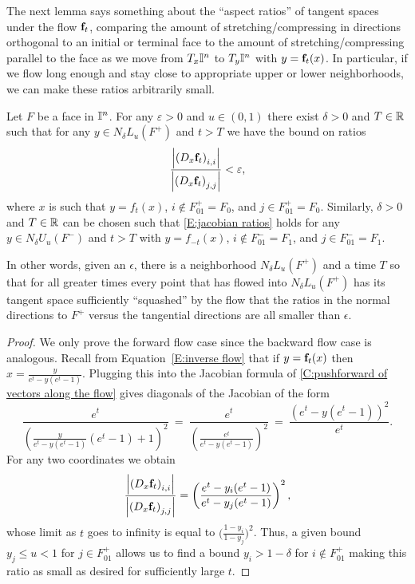The next lemma says something about the ``aspect ratios'' of tangent spaces under the flow $\mathbf{f}_t$, comparing the amount of stretching/compressing in directions orthogonal to an initial or terminal face to the amount of stretching/compressing parallel to the face as we move from $T_x\mathbb{I}^n$ to $T_{y}\mathbb{I}^n$ with $y=\mathbf{f}_t(x)$.
In particular, if we flow long enough and stay close to appropriate upper or lower neighborhoods, we can make these ratios arbitrarily small.

\begin{lemma}\label{L:jacobian ratios}
	Let $F$ be a face in $\mathbb{I}^n$.
	For any $\varepsilon > 0$ and $u \in (0,1)$ there exist $\delta > 0$ and $T\in \mathbb{R}$ such that for any $y \in N_\delta L_u(F^+)$ and $t>T$ we have the bound on ratios
	\begin{equation}\label{E:jacobian ratios}
		\frac{\left|\left(D_{x}\mathbf{f}_t\right)_{i,i}\right|}
		{\left|\left(D_{x}\mathbf{f}_t\right)_{j,j}\right|} < \varepsilon,
	\end{equation}
	where $x$ is such that $y = f_t(x)$, $i \not\in F^+_{01} = F_0$, and $j \in F^+_{01} = F_0$.
	Similarly, $\delta > 0$ and $T\in \mathbb{R}$ can be chosen such that \eqref{E:jacobian ratios} holds for any $y \in N_\delta U_u(F^-)$ and $t>T$ with $y = f_{-t}(x)$, $i \not\in F^-_{01} = F_1$, and $j \in F^-_{01} = F_1$.
\end{lemma}

In other words, given an $\epsilon$, there is a neighborhood $N_\delta L_u(F^+)$ and a time $T$ so that for all greater times every point that has flowed into $N_\delta L_u(F^+)$ has its tangent space sufficiently ``squashed'' by the flow that the ratios in the normal directions to $F^+$ versus the tangential directions are all smaller than $\epsilon$.

\begin{proof}
	We only prove the forward flow case since the backward flow case is analogous.
	Recall from Equation~\eqref{E:inverse flow} that if $y = \mathbf{f}_t(x)$ then $x = \frac{y}{e^t-y(e^t-1)}$.
	Plugging this into the Jacobian formula of \cref{C:pushforward of vectors along the flow} gives diagonals of the Jacobian of the form
	\begin{equation*}
		\frac{e^t}{\left(\frac{y}{e^t-y(e^t-1)}(e^t -1) + 1\right)^2} \ = \
		\frac{e^t}{\left(\frac{e^t}{e^t-y(e^t-1)}\right)^2} \ = \
		\frac{\left(e^t-y(e^t-1)\right)^2}{e^t}.
	\end{equation*}
	For any two coordinates we obtain
	\begin{equation*}
		\frac{\left|\left(D_{x}\mathbf{f}_t\right)_{i,i}\right|}
		{\left|\left(D_{x}\mathbf{f}_t\right)_{j,j}\right|} = \left(\frac{e^t-y_i(e^t-1)}{e^t-y_j(e^t-1)}\right)^2,
	\end{equation*}
	whose limit as $t$ goes to infinity is equal to $\big(\frac{1-y_i}{1-y_j}\big)^2$.
	Thus, a given bound $y_j \leq u<1$ for $j \in F^+_{01}$ allows us to find a bound $y_i > 1- \delta$ for $i \not\in F^+_{01}$ making this ratio as small as desired for sufficiently large $t$.
\end{proof}

